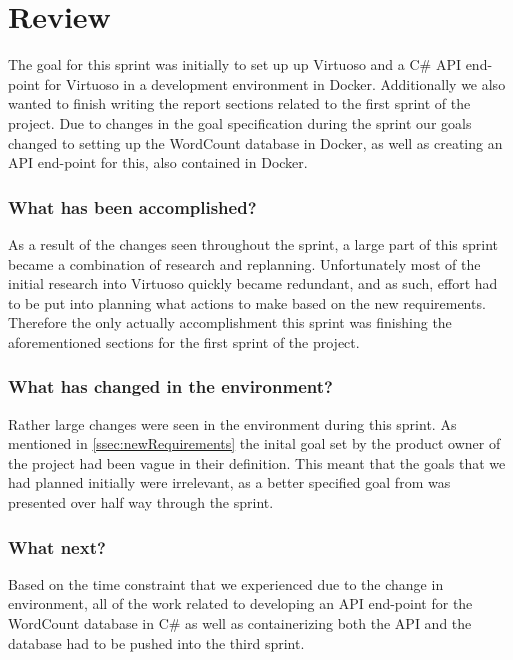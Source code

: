 \section{Review}
The goal for this sprint was initially to set up up Virtuoso and a C\# API end-point for Virtuoso in a development environment in Docker. Additionally we also wanted to finish writing the report sections related to the first sprint of the \knox{} project. Due to changes in the goal specification during the sprint our goals changed to setting up the WordCount database in Docker, as well as creating an API end-point for this, also contained in Docker.

\subsubsection*{What has been accomplished?}
As a result of the changes seen throughout the sprint, a large part of this sprint became a combination of research and replanning. Unfortunately most of the initial research into Virtuoso quickly became redundant, and as such, effort had to be put into planning what actions to make based on the new requirements. Therefore the only actually accomplishment this sprint was finishing the aforementioned sections for the first sprint of the \knox{} project.  

\subsubsection*{What has changed in the environment?}
Rather large changes were seen in the environment during this sprint. As mentioned in \ref{ssec:newRequirements} the inital goal set by the product owner of the \know{} project had been vague in their definition. This meant that the goals that we had planned initially were irrelevant, as a better specified goal from \knox{} was presented over half way through the sprint. 

\subsubsection*{What next?}
Based on the time constraint that we experienced due to the change in environment, all of the work related to developing an API end-point for the WordCount database in C\# as well as containerizing both the API and the database had to be pushed into the third sprint.

